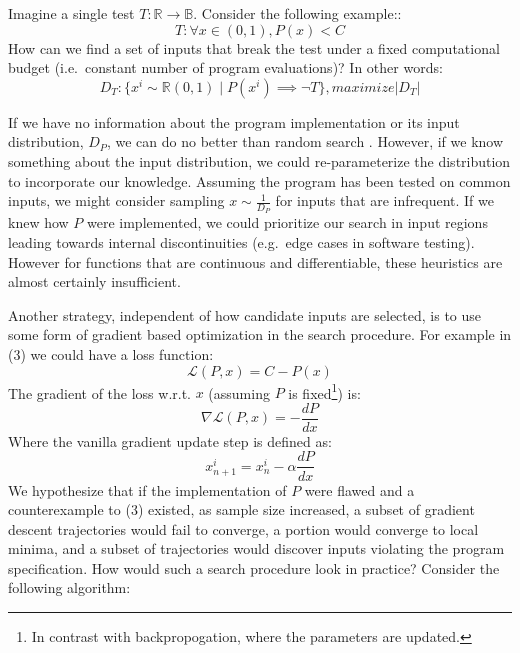 \documentclass[12pt,initial,twoside,maitrise]{dms}
\numberwithin{equation}{section}
\numberwithin{table}{chapter}
\numberwithin{figure}{chapter}
\begin{document}
%
%
Imagine a single test $T: \mathbb{R} \rightarrow \mathbb{B}$. Consider the following example::
%
\begin{equation}
    T: \forall x \in (0, 1), P(x) < C
\end{equation}
%
How can we find a set of inputs that break the test under a fixed computational budget (i.e.\ constant number of program evaluations)? In other words:
%
\begin{equation}
    D_T: \{ x^i \sim \mathbb{R}(0, 1) \mid P(x^i) \implies \neg T \}, maximize |D_T|
\end{equation}
%

If we have no information about the program implementation or its input distribution, $D_P$, we can do no better than random search \cite{wolpert1997no}. However, if we know something about the input distribution, we could re-parameterize the distribution to incorporate our knowledge. Assuming the program has been tested on common inputs, we might consider sampling $x \sim \frac{1}{D_P}$ for inputs that are infrequent. If we knew how $P$ were implemented, we could prioritize our search in input regions leading towards internal discontinuities (e.g.\ edge cases in software testing). However for functions that are continuous and differentiable, these heuristics are almost certainly insufficient.


Another strategy, independent of how candidate inputs are selected, is to use some form of gradient based optimization in the search procedure. For example in (3) we could have a loss function:
%
\begin{equation}
    \mathcal{L}(P, x) = C - P(x)
\end{equation}
%
The gradient of the loss w.r.t. $x$ (assuming $P$ is fixed\footnote{In contrast with backpropogation, where the parameters are updated.}) is:
%
\begin{equation}
    \nabla \mathcal{L}(P, x) = - \frac{dP}{dx}
\end{equation}
%
Where the vanilla gradient update step is defined as:
%
\begin{equation}
    x_{n+1}^i=x_{n}^i - \alpha\frac{dP}{dx}
\end{equation}
%
We hypothesize that if the implementation of $P$ were flawed and a counterexample to (3) existed, as sample size increased, a subset of gradient descent trajectories would fail to converge, a portion would converge to local minima, and a subset of trajectories would discover inputs violating the program specification. How would such a search procedure look in practice? Consider the following algorithm:
\end{document}
